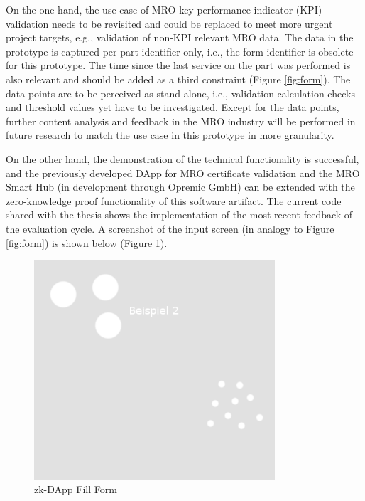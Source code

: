 On the one hand, the use case of MRO key performance indicator (KPI) validation needs to be revisited and could be replaced to meet more urgent project targets, e.g., validation of non-KPI relevant MRO data. The data in the prototype is captured per part identifier only, i.e., the form identifier is obsolete for this prototype. The time since the last service on the part was performed is also relevant and should be added as a third constraint (Figure \ref{fig:form}). The data points are to be perceived as stand-alone, i.e., validation calculation checks and threshold values yet have to be investigated. Except for the data points, further content analysis and feedback in the MRO industry will be performed in future research to match the use case in this prototype in more granularity.

On the other hand, the demonstration of the technical functionality is successful, and the previously developed DApp for MRO certificate validation and the MRO Smart Hub (in development through Opremic GmbH) can be extended with the zero-knowledge proof functionality of this software artifact. The current code shared with the thesis shows the implementation of the most recent feedback of the evaluation cycle. A screenshot of the input screen (in analogy to Figure \ref{fig:form}) is shown below (Figure \ref{fig:form1}).
\begin{figure}[hbt]
	\centering
		\includegraphics[width=0.8\textwidth]{Pictures/bsp2.png}
	\caption{zk-DApp Fill Form}
	\label{fig:form1}
\end{figure}
